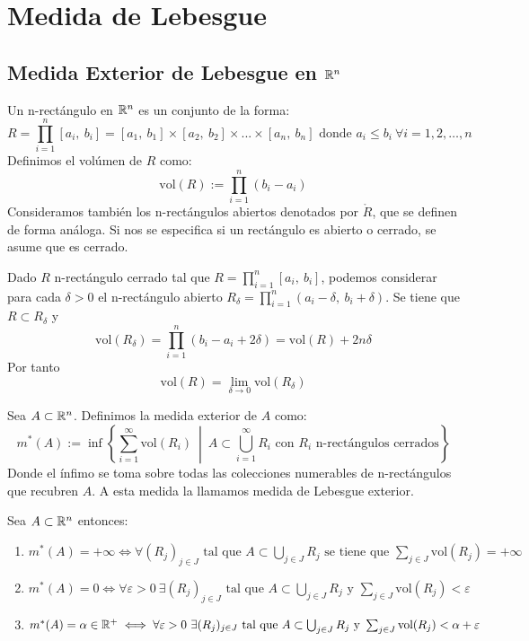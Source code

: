 
\section{Medida de Lebesgue}

\subsection{Medida Exterior de Lebesgue en $\mathbb{R}^n$}

\begin{definición}
Un n-rectángulo en $\mathbb{R}^n$ es un conjunto de la forma:
\[
    R = \prod_{i=1}^n [a_i, \ b_i] = [a_1, \ b_1] \times [a_2, \ b_2] \times ... \times [a_n, \ b_n] \text{ donde } a_i \leq b_i \ \forall i = 1, 2, \ldots, n
\]
Definimos el volúmen de $R$ como:
\[
    \text{vol}(R) := \prod_{i=1}^n (b_i - a_i)
\]
Consideramos también los n-rectángulos abiertos denotados por $\mathring{R}$,
que se definen de forma análoga. Si nos se especifica si un rectángulo es
abierto o cerrado, se asume que es cerrado.
\end{definición}

\begin{observación}
Dado $R$ n-rectángulo cerrado tal que $R = \prod_{i=1}^n [a_i, \ b_i]$, podemos considerar para cada $\delta > 0$ el n-rectángulo abierto $R_\delta = \prod_{i=1}^n (a_i - \delta, \ b_i + \delta)$. Se tiene que
$R \subset R_\delta$ y
$$\text{vol}(R_\delta) = \prod_{i=1}^n (b_i - a_i + 2\delta) = \text{vol}(R) + 2n\delta$$
Por tanto
\[
    \text{vol}(R) = \lim_{\delta \to 0} \text{vol}(R_\delta)
\]
\end{observación}

\begin{definición}
Sea $A \subset \mathbb{R}^n$. Definimos la medida exterior de $A$ como:
\[
    m^*(A) := \inf \left\{ \sum_{i=1}^\infty \text{vol}(R_i) \ \middle| \ A \subset \bigcup_{i=1}^\infty R_i \text{ con } R_i \text{ n-rectángulos cerrados} \right\}
\]
Donde el ínfimo se toma sobre todas las colecciones numerables de n-rectángulos
que recubren $A$. A esta medida la llamamos medida de Lebesgue exterior.
\end{definición}

\begin{observación}
Sea $A \subset \mathbb{R}^n$ entonces:
\vspace{-0.5em}
\begin{enumerate}
    \item $m^*(A) = +\infty \iff \forall (R_j)_{j \in J} \text{ tal que } A \subset \bigcup_{j \in J} R_j \text{ se tiene que } \sum_{j \in J} \text{vol}(R_j) = +\infty$
    \item $m^*(A) = 0 \iff \forall \varepsilon > 0 \ \exists (R_j)_{j \in J} \text{ tal que } A \subset \bigcup_{j \in J} R_j \text{ y } \sum_{j \in J} \text{vol}(R_j) < \varepsilon$
    \item $m^*(A) = \alpha \in \mathbb{R}^+ \iff \forall \varepsilon > 0 \ \exists (R_j)_{j \in J} \text{ tal que } A \subset \bigcup_{j \in J} R_j \text{ y } \sum_{j \in J} \text{vol}(R_j) < \alpha + \varepsilon$
\end{enumerate}
\end{observación}

